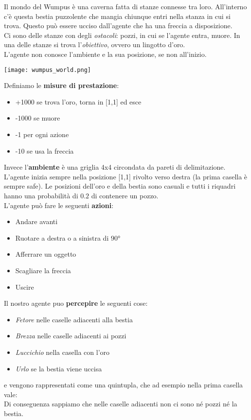 \begin{example}
	\label{example:wumpus_world}
	Il mondo del Wumpus è una caverna fatta di stanze connesse tra loro. All'interno c'è questa bestia puzzolente che mangia chiunque entri nella stanza in cui si trova. Questo può essere ucciso dall'agente che ha una freccia a disposizione.\\
	Ci sono delle stanze con degli \textit{ostacoli}: pozzi, in cui se l'agente entra, muore. In una delle stanze si trova l'\textit{obiettivo}, ovvero un lingotto d'oro.\\
	L'agente non conosce l'ambiente e la sua posizione, se non all'inizio.
	\begin{center}
		\texttt{[image: wumpus\_world.png]}
	\end{center}
	Definiamo le \textbf{misure di prestazione}:
	\begin{itemize}
		\item +1000 se trova l'oro, torna in [1,1] ed esce
		\item -1000 se muore
		\item -1 per ogni azione
		\item -10 se usa la freccia
	\end{itemize}
	Invece l'\textbf{ambiente} è una griglia 4x4 circondata da pareti di delimitazione. L'agente inizia sempre nella posizione [1,1] rivolto verso destra (la prima casella è sempre safe). Le posizioni dell'oro e della bestia sono casuali e tutti i riquadri hanno una probabilità di $0.2$ di contenere un pozzo.\\
	L'agente può fare le seguenti \textbf{azioni}:
	\begin{itemize}
		\item Andare avanti
		\item Ruotare a destra o a sinistra di $90°$
		\item Afferrare un oggetto
		\item Scagliare la freccia
		\item Uscire
	\end{itemize}
	Il nostro agente puo \textbf{percepire} le seguenti cose:
	\begin{itemize}
		\item \textit{Fetore} nelle caselle adiacenti alla bestia
		\item \textit{Brezza} nelle caselle adiacenti ai pozzi
		\item \textit{Luccichio} nella casella con l'oro
		\item \textit{Urlo} se la bestia viene uccisa
	\end{itemize}
	e vengono rappresentati come una quintupla, che ad  esempio nella prima casella vale:
	\begin{equation*}
		[none,none,none,none,none]
	\end{equation*}
	Di conseguenza sappiamo che nelle caselle adiacenti non ci sono né pozzi né la bestia.
\end{example}


